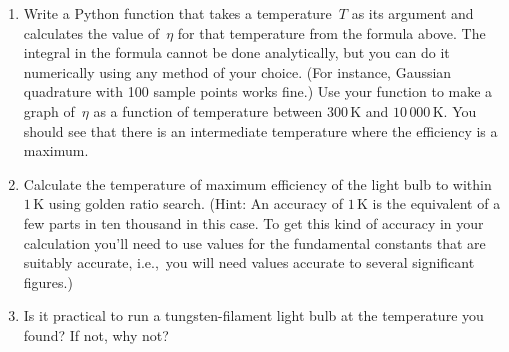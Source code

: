 \documentclass[12pt]{article}
\begin{document}
\begin{exercises}
\begin{enumerate}\setlength{\itemsep}{0pt}
\item Write a Python function that takes a temperature~$T$ as its argument
  and calculates the value of~$\eta$ for that temperature from the formula
  above.  The integral in the formula cannot be done analytically, but you
  can do it numerically using any method of your choice.  (For instance,
  Gaussian quadrature with 100 sample points works fine.)  Use your
  function to make a graph of~$\eta$ as a function of temperature between
  $300\,$K and $10\,000\,$K.  You should see that there is an intermediate
  temperature where the efficiency is a maximum.
\item Calculate the temperature of maximum efficiency of the light bulb to
  within $1\,$K using golden ratio search.  (Hint: An accuracy of $1\,$K is
  the equivalent of a few parts in ten thousand in this case.  To get this
  kind of accuracy in your calculation you'll need to use values for the
  fundamental constants that are suitably accurate, i.e.,~you will need
  values accurate to several significant figures.)
\item Is it practical to run a tungsten-filament light bulb at the
  temperature you found?  If not, why not?
\end{enumerate}

\end{exercises}
\end{document}
